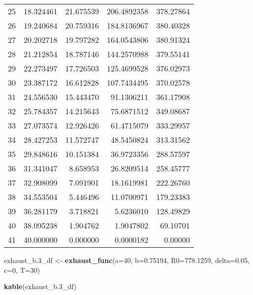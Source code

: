 \documentclass[
]{article}
\newenvironment{Shaded}{\begin{snugshade}}{\end{snugshade}}
\newcommand{\AttributeTok}[1]{\textcolor[rgb]{0.13,0.29,0.53}{#1}}
\newcommand{\DecValTok}[1]{\textcolor[rgb]{0.00,0.00,0.81}{#1}}
\newcommand{\FloatTok}[1]{\textcolor[rgb]{0.00,0.00,0.81}{#1}}
\newcommand{\FunctionTok}[1]{\textcolor[rgb]{0.13,0.29,0.53}{\textbf{#1}}}
\newcommand{\NormalTok}[1]{#1}
\newcommand{\OtherTok}[1]{\textcolor[rgb]{0.56,0.35,0.01}{#1}}
\begin{document}
\begin{longtable}[]{@{}rrrrr@{}}
25 & 18.324461 & 21.675539 & 206.4892358 & 378.27864 \\
26 & 19.240684 & 20.759316 & 184.8136967 & 380.40328 \\
27 & 20.202718 & 19.797282 & 164.0543806 & 380.91324 \\
28 & 21.212854 & 18.787146 & 144.2570988 & 379.55141 \\
29 & 22.273497 & 17.726503 & 125.4699528 & 376.02973 \\
30 & 23.387172 & 16.612828 & 107.7434495 & 370.02578 \\
31 & 24.556530 & 15.443470 & 91.1306211 & 361.17908 \\
32 & 25.784357 & 14.215643 & 75.6871512 & 349.08687 \\
33 & 27.073574 & 12.926426 & 61.4715079 & 333.29957 \\
34 & 28.427253 & 11.572747 & 48.5450824 & 313.31562 \\
35 & 29.848616 & 10.151384 & 36.9723356 & 288.57597 \\
36 & 31.341047 & 8.658953 & 26.8209514 & 258.45777 \\
37 & 32.908099 & 7.091901 & 18.1619981 & 222.26760 \\
38 & 34.553504 & 5.446496 & 11.0700971 & 179.23383 \\
39 & 36.281179 & 3.718821 & 5.6236010 & 128.49829 \\
40 & 38.095238 & 1.904762 & 1.9047802 & 69.10701 \\
41 & 40.000000 & 0.000000 & 0.0000182 & 0.00000 \\
\end{longtable}

\begin{Shaded}
\begin{Highlighting}[]
\NormalTok{exhaust\_b}\FloatTok{.3}\NormalTok{\_df }\OtherTok{\textless{}{-}} \FunctionTok{exhaust\_func}\NormalTok{(}\AttributeTok{a=}\DecValTok{40}\NormalTok{, }\AttributeTok{b=}\FloatTok{0.75194}\NormalTok{, }\AttributeTok{R0=}\FloatTok{778.1259}\NormalTok{, }\AttributeTok{delta=}\FloatTok{0.05}\NormalTok{, }\AttributeTok{c=}\DecValTok{0}\NormalTok{, }\AttributeTok{T=}\DecValTok{30}\NormalTok{)}

\FunctionTok{kable}\NormalTok{(exhaust\_b}\FloatTok{.3}\NormalTok{\_df)}
\end{Highlighting}
\end{Shaded}
\end{document}
